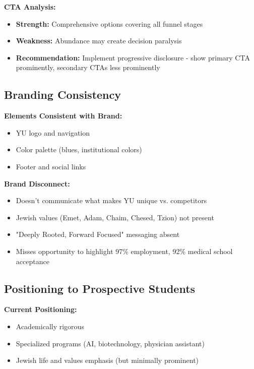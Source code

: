 \documentclass[12pt,letterpaper]{article}
\begin{document}
\textbf{CTA Analysis:}
\begin{itemize}[leftmargin=*]
    \item \textbf{Strength:} Comprehensive options covering all funnel stages
    \item \textbf{Weakness:} Abundance may create decision paralysis
    \item \textbf{Recommendation:} Implement progressive disclosure - show primary CTA prominently, secondary CTAs less prominently
\end{itemize}

\subsection{Branding Consistency}

\textbf{Elements Consistent with Brand:}
\begin{itemize}[leftmargin=*]
    \item YU logo and navigation
    \item Color palette (blues, institutional colors)
    \item Footer and social links
\end{itemize}

\textbf{Brand Disconnect:}
\begin{itemize}[leftmargin=*]
    \item Doesn't communicate what makes YU unique vs. competitors
    \item Jewish values (Emet, Adam, Chaim, Chesed, Tzion) not present
    \item "Deeply Rooted, Forward Focused" messaging absent
    \item Misses opportunity to highlight 97\% employment, 92\% medical school acceptance
\end{itemize}

\subsection{Positioning to Prospective Students}

\textbf{Current Positioning:}
\begin{itemize}[leftmargin=*]
    \item Academically rigorous
    \item Specialized programs (AI, biotechnology, physician assistant)
    \item Jewish life and values emphasis (but minimally prominent)
\end{itemize}
\end{document}
